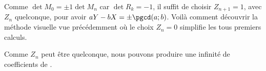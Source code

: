  
 \medskip
 
 
Comme $\det M_0 = \pm 1 \det M_n$ car $\det R_k = -1$, il suffit de choisir $Z_{n+1} = 1$, avec $Z_n$ quelconque, pour avoir $aY - bX = \pm \pgcd(a ; b)$. Voilà comment découvrir la méthode visuelle vue précédemment où le choix $Z_n = 0$ simplifie les tous premiers calculs.


\begin{remark}
	Comme $Z_n$ peut être quelconque, nous pouvons produire une infinité de coefficients de \bb.
\end{remark}



